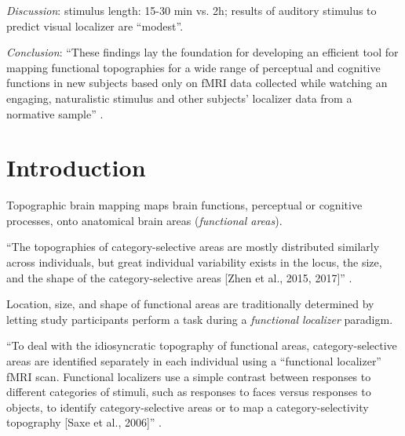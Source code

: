 %
\textit{Discussion}: stimulus length: 15-30 min vs. 2h;  results of auditory stimulus to predict visual localizer are ``modest''.

%
\textit{Conclusion}: ``These findings lay the foundation for developing an
efficient tool for mapping functional topographies for a wide range of
perceptual and cognitive functions in new subjects based only on fMRI data
collected while watching an engaging, naturalistic stimulus and other subjects'
localizer data from a normative sample'' \citep{jiahui2020predicting}.


\section{Introduction}



Topographic brain mapping maps brain functions, perceptual or cognitive
processes, onto anatomical brain areas (\textit{functional areas}).

%
``The topographies of category-selective areas are mostly distributed similarly
across individuals, but great individual variability exists in the locus, the
size, and the shape of the category-selective areas [Zhen et al., 2015, 2017]''
\citep{jiahui2020predicting}.


Location, size, and shape of functional areas are traditionally determined by
letting study participants perform a task during a \textit{functional localizer}
paradigm.

%
``To deal with the idiosyncratic topography of functional areas,
category-selective areas are identified separately in each individual using a
``functional localizer'' fMRI scan.
%
Functional localizers use a simple contrast between responses to different
categories of stimuli, such as responses to faces versus responses to objects,
to identify category-selective areas or to map a category-selectivity topography
[Saxe et al., 2006]'' \citep{jiahui2020predicting}.

